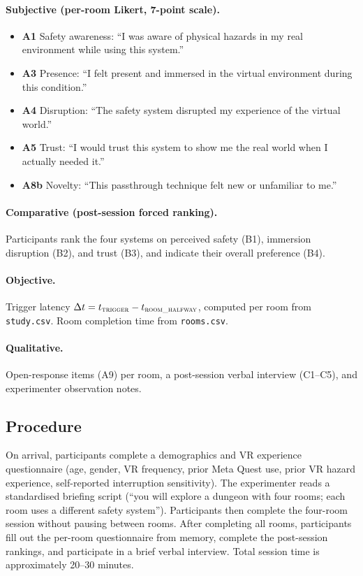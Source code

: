 \documentclass{styling/vgtc} %
\begin{document}
\paragraph{Subjective (per-room Likert, 7-point scale).}
\begin{itemize}
  \item \textbf{A1} Safety awareness: ``I was aware of physical hazards
    in my real environment while using this system.''
  \item \textbf{A3} Presence: ``I felt present and immersed in the
    virtual environment during this condition.''
  \item \textbf{A4} Disruption: ``The safety system disrupted my
    experience of the virtual world.''
  \item \textbf{A5} Trust: ``I would trust this system to show me the
    real world when I actually needed it.''
  \item \textbf{A8b} Novelty: ``This passthrough technique felt new or
    unfamiliar to me.''
\end{itemize}

\paragraph{Comparative (post-session forced ranking).}
Participants rank the four systems on perceived safety (B1), immersion
disruption (B2), and trust (B3), and indicate their overall preference (B4).

\paragraph{Objective.}
Trigger latency $\Delta t = t_{\textsc{trigger}} - t_{\textsc{room\_halfway}}$,
computed per room from \texttt{study.csv}. Room completion time from
\texttt{rooms.csv}.

\paragraph{Qualitative.}
Open-response items (A9) per room, a post-session verbal interview (C1--C5),
and experimenter observation notes.

\subsection{Procedure}

On arrival, participants complete a demographics and VR experience
questionnaire (age, gender, VR frequency, prior Meta Quest use,
prior VR hazard experience, self-reported interruption sensitivity).
The experimenter reads a standardised briefing script (``you will explore
a dungeon with four rooms; each room uses a different safety system'').
Participants then complete the four-room session without pausing between
rooms. After completing all rooms, participants fill out the per-room
questionnaire from memory, complete the post-session rankings, and
participate in a brief verbal interview. Total session time is
approximately 20--30 minutes.
\end{document}
